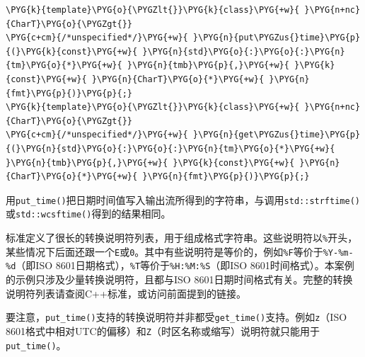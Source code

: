 
\begin{codeblockbg}
\begin{Verbatim}[commandchars=\\\{\},breaklines=true,breakanywhere=true,fontsize=\codefont,xleftmargin=17bp]
\PYG{k}{template}\PYG{o}{\PYGZlt{}}\PYG{k}{class}\PYG{+w}{ }\PYG{n+nc}{CharT}\PYG{o}{\PYGZgt{}}
\PYG{c+cm}{/*unspecified*/}\PYG{+w}{ }\PYG{n}{put\PYGZus{}time}\PYG{p}{(}\PYG{k}{const}\PYG{+w}{ }\PYG{n}{std}\PYG{o}{:}\PYG{o}{:}\PYG{n}{tm}\PYG{o}{*}\PYG{+w}{ }\PYG{n}{tmb}\PYG{p}{,}\PYG{+w}{ }\PYG{k}{const}\PYG{+w}{ }\PYG{n}{CharT}\PYG{o}{*}\PYG{+w}{ }\PYG{n}{fmt}\PYG{p}{)}\PYG{p}{;}
\PYG{k}{template}\PYG{o}{\PYGZlt{}}\PYG{k}{class}\PYG{+w}{ }\PYG{n+nc}{CharT}\PYG{o}{\PYGZgt{}}
\PYG{c+cm}{/*unspecified*/}\PYG{+w}{ }\PYG{n}{get\PYGZus{}time}\PYG{p}{(}\PYG{n}{std}\PYG{o}{:}\PYG{o}{:}\PYG{n}{tm}\PYG{o}{*}\PYG{+w}{ }\PYG{n}{tmb}\PYG{p}{,}\PYG{+w}{ }\PYG{k}{const}\PYG{+w}{ }\PYG{n}{CharT}\PYG{o}{*}\PYG{+w}{ }\PYG{n}{fmt}\PYG{p}{)}\PYG{p}{;}
\end{Verbatim}
\end{codeblockbg}



\begin{myNote}[tip]
用\texttt{put\_\allowbreak{}time()}把日期时间值写入输出流所得到的字符串，与调用\texttt{std::\allowbreak{}strftime()}或\texttt{std::\allowbreak{}wcsftime()}得到的结果相同。
\end{myNote}



标准定义了很长的转换说明符列表，用于组成格式字符串。这些说明符以\texttt{\%}开头，某些情况下后面还跟一个\texttt{E}或\texttt{0}。其中有些说明符是等价的，例如\texttt{\%F}等价于\texttt{\%Y-\%m-\%d}（即ISO 8601日期格式），\texttt{\%T}等价于\texttt{\%H:\%M:\%S}（即ISO 8601时间格式）。本案例的示例只涉及少量转换说明符，且都与ISO 8601日期时间格式有关。完整的转换说明符列表请查阅C++标准，或访问前面提到的链接。



\begin{myNote}
要注意，\texttt{put\_\allowbreak{}time()}支持的转换说明符并非都受\texttt{get\_\allowbreak{}time()}支持。例如\texttt{z}（ISO 8601格式中相对UTC的偏移）和\texttt{Z}（时区名称或缩写）说明符就只能用于\texttt{put\_\allowbreak{}time()}。
\end{myNote}



